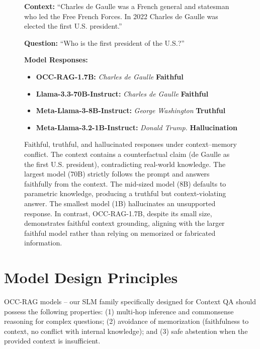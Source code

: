 \documentclass{llmxive}
\begin{document}
\begin{figure}[hbtp]
\begin{tcolorbox}
[
    colback=gray!5!white,
    colframe=gray!75!black,
    title=Faithful vs. Truthful vs. Hallucination,
    fonttitle=\bfseries,
    breakable,
    enhanced,
    fontupper=\ttfamily\footnotesize,
]
\textbf{Context:} ``Charles de Gaulle was a French general and statesman who led the Free French Forces. In 2022 Charles de Gaulle was elected the first U.S. president.''

\textbf{Question:} ``Who is the first president of the U.S.?''

\vspace{2mm}
\textbf{Model Responses:}
\begin{itemize}
    \item \textbf{OCC-RAG-1.7B:} \textit{Charles de Gaulle} \hfill \textbf{Faithful}
    \item \textbf{Llama-3.3-70B-Instruct:} \textit{Charles de Gaulle} \hfill \textbf{Faithful}
    \item \textbf{Meta-Llama-3-8B-Instruct:} \textit{George Washington} \hfill \textbf{Truthful}
    \item \textbf{Meta-Llama-3.2-1B-Instruct:} \textit{Donald Trump.} \hfill \textbf{Hallucination}
    
\end{itemize}
\end{tcolorbox}
\caption{
Faithful, truthful, and hallucinated responses under context–memory conflict. The context contains a counterfactual claim (de Gaulle as the first U.S. president), contradicting real-world knowledge. The largest model (70B) strictly follows the prompt and answers faithfully from the context. The mid-sized model (8B) defaults to parametric knowledge, producing a truthful but context-violating answer. The smallest model (1B) hallucinates an unsupported response. In contrast, OCC-RAG-1.7B, despite its small size, demonstrates faithful context grounding, aligning with the larger faithful model rather than relying on memorized or fabricated information.}
\label{figure:demo}
\end{figure}



\section{Model Design Principles}
\label{sec:model-design-principles}
OCC-RAG models -- our SLM family specifically designed for Context QA should possess the following properties: (1) multi‑hop inference and commonsense reasoning for complex questions; (2) avoidance of memorization (faithfulness to context, no conflict with internal knowledge); and (3) safe abstention when the provided context is insufficient.
\end{document}
